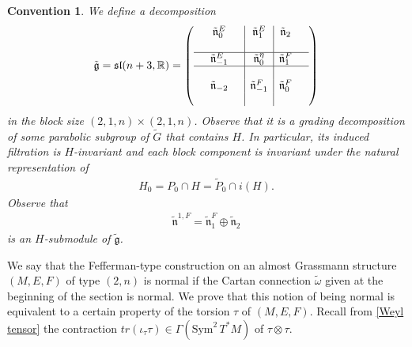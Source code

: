 \documentclass[11pt]{amsart}
\newtheorem{remark}[proposition]{Remark}
\newtheorem{convention}[proposition]{Convention}
\begin{document}

\begin{convention}\label{H0 invariant LA decomp}
We define a decomposition
    \begin{align*}
\tilde{\mathfrak g}=\mathfrak {sl}(n+3,\mathbb R)=\left(\begin{array}{ccc|c|ccc}
	&\tilde{\mathfrak n}^E_{0}&&\tilde{\mathfrak n}_{1}^E&\tilde{\mathfrak n}_{2}&\\
 &&&&&\\
 \hline &\tilde{\mathfrak n}_{-1}^E&&\tilde{\mathfrak n}^\eta_{0}&\tilde{\mathfrak n}_{1}^F&\\
	\hline&&&&&\\
    &\tilde{\mathfrak n}_{-2}&&\tilde{\mathfrak n}_{-1}^F&\tilde{\mathfrak n}^F_{0}&\\
&& &&&\end{array}\right)
\end{align*}
in the block size $(2,1,n)\times(2,1,n)$. Observe that it is a grading decomposition of some parabolic subgroup of $\tilde G$ that contains $H$. In particular, its induced filtration is $H$-invariant and each block component is invariant under the natural representation of
\begin{align}\label{H0}
H_0=P_0\cap H=\tilde P_0\cap i(H).
\end{align}
Observe that
\begin{align*}
\tilde{\mathfrak n}^{1,F}=\tilde{\mathfrak n}_{1}^F\oplus\tilde{\mathfrak n}_{2}
\end{align*}
is an $H$-submodule of $\tilde{\mathfrak g}$. 
\end{convention}
 
We say that the Fefferman-type construction on an almost Grassmann structure $(M,E,F)$ of type $(2,n)$ is normal if the Cartan connection $\tilde\omega$ given at the beginning of the section is normal. We prove that this notion of being normal is equivalent to a certain property of the torsion $\tau$ of $(M,E,F)$. Recall from \cref{Weyl tensor} the contraction $tr(\iota_\tau\tau)\in\Gamma(\mathrm{Sym}^2\,T^*M)$ of $\tau\otimes\tau$.
\end{document}
